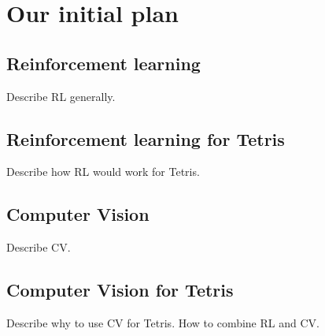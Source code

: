 \section{Our initial plan}

\subsection{Reinforcement learning}
Describe RL generally.

\subsection{Reinforcement learning for Tetris}
Describe how RL would work for Tetris.

\subsection{Computer Vision}
Describe CV.

\subsection{Computer Vision for Tetris}
Describe why to use CV for Tetris.
How to combine RL and CV.

